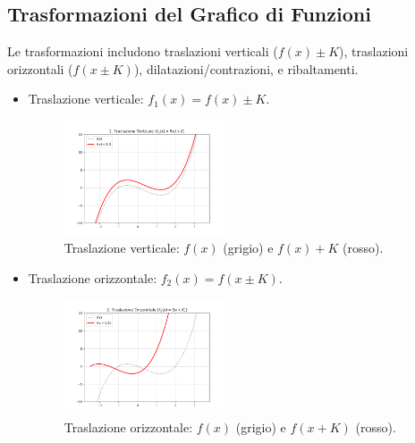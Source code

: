 \subsection{Trasformazioni del Grafico di Funzioni}
Le trasformazioni includono traslazioni verticali ($f(x) \pm K$), traslazioni orizzontali ($f(x \pm K)$), dilatazioni/contrazioni, e ribaltamenti.

\begin{itemize}
\item Traslazione verticale: $f_1(x) = f(x) \pm K$.
  \begin{figure}[H] %
    \centering
    \includegraphics[width=0.45\textwidth]{img/traslazione_verticale.png}
    \caption{Traslazione verticale: $f(x)$ (grigio) e $f(x)+K$ (rosso).}
  \end{figure}

\item Traslazione orizzontale: $f_2(x) = f(x \pm K)$.
    \begin{figure}[H]
    \centering
    \includegraphics[width=0.45\textwidth]{img/traslazione_orizzontale.png}
    \caption{Traslazione orizzontale: $f(x)$ (grigio) e $f(x+K)$ (rosso).}
  \end{figure}


\end{itemize}

